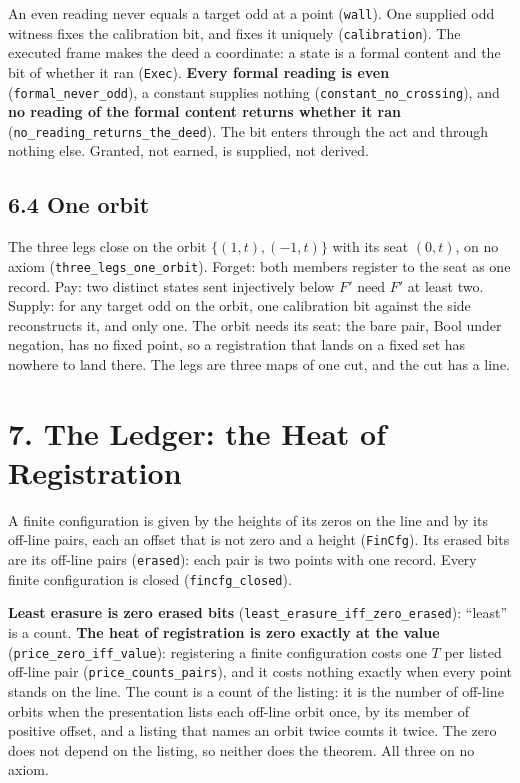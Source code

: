 \documentclass[10pt,twocolumn]{article}
\begin{document}
An even reading never equals a target odd at a point (\texttt{wall}).
One supplied odd witness fixes the calibration bit, and fixes it
uniquely (\texttt{calibration}). The executed frame makes the deed a
coordinate: a state is a formal content and the bit of whether it ran
(\texttt{Exec}). \textbf{Every formal reading is even}
(\texttt{formal\_\allowbreak{}never\_\allowbreak{}odd}), a constant supplies nothing
(\texttt{constant\_\allowbreak{}no\_\allowbreak{}crossing}), and \textbf{no reading of the formal
content returns whether it ran}
(\texttt{no\_\allowbreak{}reading\_\allowbreak{}returns\_\allowbreak{}the\_\allowbreak{}deed}). The bit enters through the
act and through nothing else. Granted, not earned, is supplied, not
derived.

\hypertarget{one-orbit}{%
\subsection{6.4 One orbit}\label{one-orbit}}

The three legs close on the orbit \(\{(1,t),(-1,t)\}\) with its seat
\((0,t)\), on no axiom (\texttt{three\_\allowbreak{}legs\_\allowbreak{}one\_\allowbreak{}orbit}). Forget: both
members register to the seat as one record. Pay: two distinct states
sent injectively below \(F'\) need \(F'\) at least two. Supply: for any
target odd on the orbit, one calibration bit against the side
reconstructs it, and only one. The orbit needs its seat: the bare pair,
Bool under negation, has no fixed point, so a registration that lands on
a fixed set has nowhere to land there. The legs are three maps of one
cut, and the cut has a line.

\hypertarget{the-ledger-the-heat-of-registration}{%
\section{7. The Ledger: the Heat of
Registration}\label{the-ledger-the-heat-of-registration}}

A finite configuration is given by the heights of its zeros on the line
and by its off-line pairs, each an offset that is not zero and a height
(\texttt{FinCfg}). Its erased bits are its off-line pairs
(\texttt{erased}): each pair is two points with one record. Every finite
configuration is closed (\texttt{fincfg\_\allowbreak{}closed}).

\textbf{Least erasure is zero erased bits}
(\texttt{least\_\allowbreak{}erasure\_\allowbreak{}iff\_\allowbreak{}zero\_\allowbreak{}erased}): ``least'' is a count.
\textbf{The heat of registration is zero exactly at the value}
(\texttt{price\_\allowbreak{}zero\_\allowbreak{}iff\_\allowbreak{}value}): registering a finite configuration
costs one \(T\) per listed off-line pair
(\texttt{price\_\allowbreak{}counts\_\allowbreak{}pairs}), and it costs nothing exactly when every
point stands on the line. The count is a count of the listing: it is the
number of off-line orbits when the presentation lists each off-line
orbit once, by its member of positive offset, and a listing that names
an orbit twice counts it twice. The zero does not depend on the listing,
so neither does the theorem. All three on no axiom.
\end{document}
